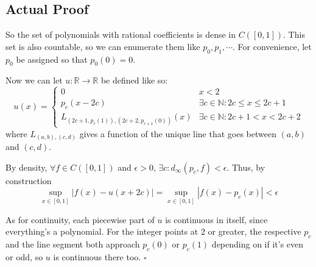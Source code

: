 \documentclass[12pt]{article}
\newcommand{\N}{\mathbb{N}}
\newcommand{\R}{\mathbb{R}}
\begin{document}
\pagebreak

\subsection{Actual Proof}

So the set of polynomials with rational coefficients is dense in $C([0, 1])$.
This set is also countable, so we can enumerate them like $p_0, p_1, \cdots$.
For convenience, let $p_0$ be assigned so that $p_0(0)=0$.

Now we can let $u: \R \to \R$ be defined like so:
\[u(x)=\begin{cases}
    0                                             & x < 2                                 \\
    p_c(x-2c)                                     & \exists c \in \N: 2c \le x \le 2c + 1 \\
    L_{(2c + 1, p_c(1)), (2c + 2, p_{c+1}(0))}(x) & \exists c \in \N: 2c + 1 < x < 2c + 2
  \end{cases}\]
where $L_{(a, b), (c, d)}$ gives a function of the unique line that goes between $(a, b)$ and $(c, d)$.

By density, $\forall f \in C([0, 1])$ and $\epsilon > 0$, $\exists c: d_\infty(p_c, f) < \epsilon$.
Thus, by construction
\[\sup_{x \in [0, 1]} |f(x)-u(x+2c)| = \sup_{x \in [0, 1]} |f(x)-p_c(x)| < \epsilon\]

As for continuity, each piecewise part of $u$ is continuous in itself,
since everything's a polynomial.
For the integer points at $2$ or greater, the respective $p_c$
and the line segment both approach $p_c(0)$ or $p_c(1)$ depending
on if it's even or odd, so $u$ is continuous there too. $\square$
\end{document}

